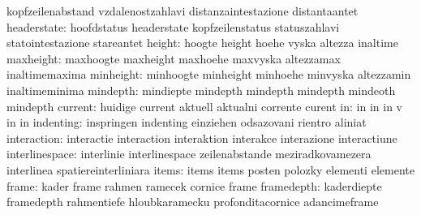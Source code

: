                           kopfzeilenabstand         vzdalenostzahlavi
                           distanzaintestazione      distantaantet
              headerstate: hoofdstatus               headerstate
                           kopfzeilenstatus          statuszahlavi
                           statointestazione         stareantet
                   height: hoogte                    height
                           hoehe                     vyska
                           altezza                   inaltime
                maxheight: maxhoogte                 maxheight
                           maxhoehe                  maxvyska
                           altezzamax                inaltimemaxima
                minheight: minhoogte                 minheight
                           minhoehe                  minvyska
                           altezzamin                inaltimeminima
                 mindepth: mindiepte                 mindepth
                           mindepth                  mindepth
                           mindeoth                  mindepth %
                  current: huidige                   current
                           aktuell                   aktualni
                           corrente                  curent
                       in: in                        in
                           in                        v
                           in                        in
                indenting: inspringen                indenting
                           einziehen                 odsazovani
                           rientro                   aliniat
              interaction: interactie                interaction
                           interaktion               interakce
                           interazione               interactiune
           interlinespace: interlinie                interlinespace
                           zeilenabstande            meziradkovamezera
                           interlinea                spatiereinterliniara
                    items: items                     items
                           posten                    polozky
                           elementi                  elemente
                    frame: kader                     frame
                           rahmen                    ramecek
                           cornice                   frame
               framedepth: kaderdiepte               framedepth
                           rahmentiefe               hloubkaramecku
                           profonditacornice         adancimeframe
